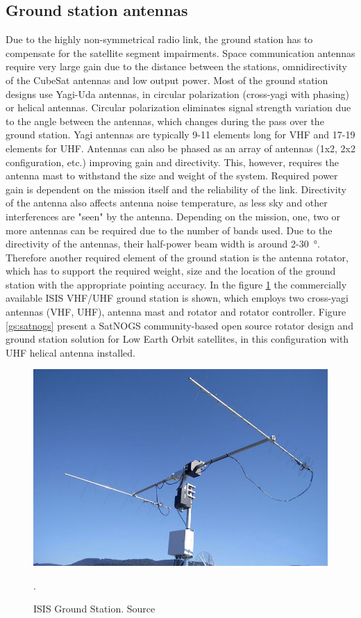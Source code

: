 \subsection{Ground station antennas}
Due to the highly non-symmetrical radio link, the ground station has to compensate for the satellite segment impairments. Space communication antennas require very large gain due to the distance between the stations, omnidirectivity of the CubeSat antennas and low output power. Most of the ground station designs use Yagi-Uda antennas, in circular polarization (cross-yagi with phasing) or helical antennas. Circular polarization eliminates signal strength variation due to the angle between the antennas, which changes during the pass over the ground station. Yagi antennas are typically 9-11 elements long for VHF and 17-19 elements for UHF. Antennas can also be phased as an array of antennas (1x2, 2x2 configuration, etc.) improving gain and directivity. This, however, requires the antenna mast to withstand the size and weight of the system. Required power gain is dependent on the mission itself and the reliability of the link. Directivity of the antenna also affects antenna noise temperature, as less sky and other interferences are "seen" by the antenna. Depending on the mission, one, two or more antennas can be required due to the number of bands used. Due to the directivity of the antennas, their half-power beam width is around \si{2}-\SI{30}{\degree}. Therefore another required element of the ground station is the antenna rotator, which has to support the required weight, size and the location of the ground station with the appropriate pointing accuracy.
In the figure \ref{isis_gs} the commercially available ISIS VHF/UHF ground station is shown, which employs two cross-yagi antennas (VHF, UHF), antenna mast and rotator and rotator controller. Figure \ref{gs:satnogs} present a SatNOGS \cite{satnogs} community-based open source rotator design and ground station solution for Low Earth Orbit satellites, in this configuration with UHF helical antenna installed.

\begin{figure}[H]
    \centering
    \includegraphics[width=0.65\paperwidth]{img/4/isis_gs.jpg}
    \caption{ISIS Ground Station. Source \cite{isis_gs}}.
    \label{isis_gs}
\end{figure}

